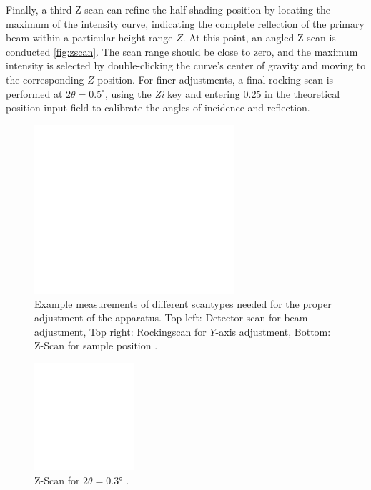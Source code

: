 Finally, a third Z-scan can refine the half-shading position by locating the maximum of the intensity curve, indicating the complete reflection of the primary beam within a particular height range \( Z \). At this point, an angled Z-scan is conducted \autoref{fig:zscan}. The scan range should be close to zero, and the maximum intensity is selected by double-clicking the curve’s center of gravity and moving to the corresponding \( Z \)-position. For finer adjustments, a final rocking scan is performed at \( 2\theta = 0.5^\circ \), using the \textit{Zi} key and entering \( 0.25 \) in the theoretical position input field to calibrate the angles of incidence and reflection.


\begin{figure}
	\centering
	\includegraphics[width=0.66\textwidth]{content/graphics/AdjustmentPlots.pdf}
	\caption{Example measurements of different scantypes needed for the proper adjustment of the apparatus. Top left: Detector scan for beam adjustment, Top right: Rockingscan for $Y$-axis adjustment, Bottom: Z-Scan for sample position \cite{xray}. }
	\label{fig:Adjustplot}
\end{figure}

\begin{figure}
	\centering
	\includegraphics[width=0.33\textwidth]{content/graphics/zscan.pdf}
	\caption{Z-Scan for $2\theta = 0.3°$ \cite{xray}.}
	\label{fig:zscan}
\end{figure}

